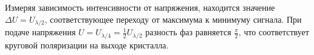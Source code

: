 Измеряя зависимость интенсивности от напряжения, находится значение $\Delta U = U_{\lambda/2}$, соответствующее переходу от максимума к минимуму сигнала. При подаче напряжения $U = U_{\lambda/4} = \frac{1}{2}U_{\lambda/2}$ разность фаз равняется $\frac{\pi}{2}$, что соответствует круговой поляризации на выходе кристалла.



